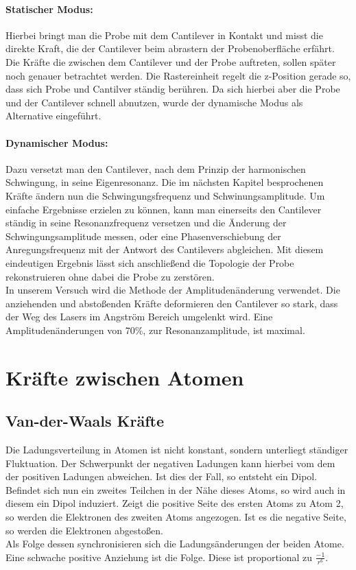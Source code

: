 \paragraph{Statischer Modus:}

Hierbei bringt man die Probe mit dem Cantilever in Kontakt und misst die direkte Kraft, die der Cantilever beim abrastern der Probenoberfläche erfährt. 
Die Kräfte die zwischen dem Cantilever und der Probe auftreten, sollen später noch genauer betrachtet werden.
Die Rastereinheit regelt die z-Position gerade so, dass sich Probe und Cantilver ständig berühren.
Da sich hierbei aber die Probe und der Cantilever schnell abnutzen, wurde der 
dynamische Modus als Alternative eingeführt.

\paragraph{Dynamischer Modus:}

Dazu versetzt man den Cantilever, nach dem Prinzip der harmonischen Schwingung, in seine Eigenresonanz.
Die im nächsten Kapitel besprochenen Kräfte ändern nun die Schwingungsfrequenz und Schwinungsamplitude.
Um einfache Ergebnisse erzielen zu können, kann man einerseits den Cantilever ständig in seine Resonanzfrequenz versetzen und die Änderung der Schwingungsamplitude messen, oder eine Phasenverschiebung der Anregungsfrequenz mit der Antwort des Cantilevers abgleichen.
Mit diesem eindeutigen Ergebnis lässt sich anschließend die Topologie der Probe rekonstruieren ohne dabei die Probe zu zerstören.
\vspace{6pt}\\
In unserem Versuch wird die Methode der Amplitudenänderung verwendet. 
Die anziehenden und abstoßenden Kräfte deformieren den Cantilever so stark, dass der Weg des Lasers im Angström Bereich umgelenkt wird. 
Eine Amplitudenänderungen von 70\%, zur Resonanzamplitude, ist maximal. 


    \section{Kräfte zwischen Atomen}
        \subsection{Van-der-Waals Kräfte}

Die Ladungsverteilung in Atomen ist nicht konstant, sondern unterliegt ständiger 
Fluktuation. Der Schwerpunkt der negativen Ladungen kann hierbei vom dem der
positiven Ladungen abweichen. Ist dies der Fall, so entsteht ein Dipol. 
Befindet sich nun ein zweites Teilchen in der Nähe dieses Atoms, so wird auch
in diesem ein Dipol induziert. Zeigt die positive Seite des ersten Atoms zu Atom 2,
so werden die Elektronen des zweiten Atoms angezogen. Ist es die negative Seite, so
werden die Elektronen abgestoßen. 
\vspace{3pt}\\
Als Folge dessen synchronisieren sich die Ladungsänderungen der beiden Atome. Eine
schwache positive Anziehung ist die Folge. Diese ist proportional zu $\displaystyle
\frac{-1}{r^6}$.


